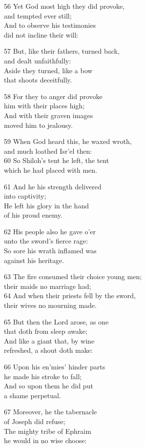 56 Yet God most high they did provoke,\\
and tempted ever still;\\
And to observe his testimonies\\
did not incline their will:

57 But, like their fathers, turned back,\\
and dealt unfaithfully:\\
Aside they turned, like a bow\\
that shoots deceitfully.

58 For they to anger did provoke\\
him with their places high;\\
And with their graven images\\
moved him to jealousy.

59 When God heard this, he waxed wroth,\\
and much loathed Isr’el then:\\
60 So Shiloh’s tent he left, the tent\\
which he had placed with men.

61 And he his strength delivered\\
into captivity;\\
He left his glory in the hand\\
of his proud enemy.

62 His people also he gave o’er\\
unto the sword’s fierce rage:\\
So sore his wrath inflamed was\\
against his heritage.

63 The fire consumed their choice young men;\\
their maids no marriage had;\\
64 And when their priests fell by the sword,\\
their wives no mourning made.

65 But then the Lord arose, as one\\
that doth from sleep awake;\\
And like a giant that, by wine\\
refreshed, a shout doth make:

66 Upon his en’mies’ hinder parts\\
he made his stroke to fall;\\
And so upon them he did put\\
a shame perpetual.

67 Moreover, he the tabernacle\\
of Joseph did refuse;\\
The mighty tribe of Ephraim\\
he would in no wise choose:

